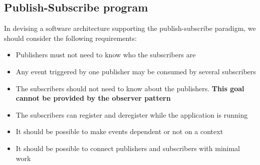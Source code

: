 \documentclass[a4paper]{article}
\begin{document}
\subsection{Publish-Subscribe program}
In devising a software architecture supporting the publish-subscribe paradigm, we should consider the following requirements:
\begin{itemize}
\item Publishers must not need to know who the subscribers are
\item Any event triggered by one publisher may be consumed by several subscribers
\item The subscribers should not need to know about the publishers. \textbf{This goal cannot be provided by the observer pattern}
\item The subscribers can register and deregister while the application is running
\item It should be possible to make events dependent or not on a context
\item It should be possible to connect publishers and subscribers with minimal work
\end{itemize}
\end{document}
